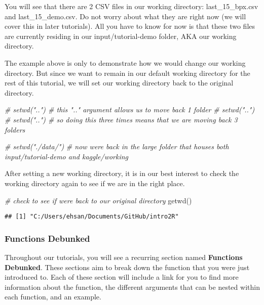 \documentclass[
]{book}
\newenvironment{Shaded}{\begin{snugshade}}{\end{snugshade}}
\newcommand{\CommentTok}[1]{\textcolor[rgb]{0.56,0.35,0.01}{\textit{#1}}}
\newcommand{\FunctionTok}[1]{\textcolor[rgb]{0.00,0.00,0.00}{#1}}
\newcommand{\NormalTok}[1]{#1}
\begin{document}
You will see that there are 2 CSV files in our working directory: last\_15\_bpx.csv and last\_15\_demo.csv. Do not worry about what they are right now (we will cover this in later tutorials). All you have to know for now is that these two files are currently residing in our input/tutorial-demo folder, AKA our working directory.

The example above is only to demonstrate how we would change our working directory. But since we want to remain in our default working directory for the rest of this tutorial, we will set our working directory back to the original directory.

\begin{Shaded}
\begin{Highlighting}[]
\CommentTok{\# setwd("..") \# this ".." argument allows us to move back 1 folder}
\CommentTok{\# setwd("..") }
\CommentTok{\# setwd("..") \# so doing this three times means that we are moving back 3 folders}


\CommentTok{\# setwd("./data/") }
\CommentTok{\# now we\textquotesingle{}re back in the large folder that houses both input/tutorial{-}demo and kaggle/working}
\end{Highlighting}
\end{Shaded}

After setting a new working directory, it is in our best interest to check the working directory again to see if we are in the right place.

\begin{Shaded}
\begin{Highlighting}[]
\CommentTok{\# check to see if we\textquotesingle{}re back to our original directory}
\FunctionTok{getwd}\NormalTok{()}
\end{Highlighting}
\end{Shaded}

\begin{verbatim}
## [1] "C:/Users/ehsan/Documents/GitHub/intro2R"
\end{verbatim}

\hypertarget{functions-debunked}{%
\subsubsection{Functions Debunked}\label{functions-debunked}}

Throughout our tutorials, you will see a recurring section named \textbf{Functions Debunked}. These sections aim to break down the function that you were just introduced to. Each of these section will include a link for you to find more information about the function, the different arguments that can be nested within each function, and an example.
\end{document}
